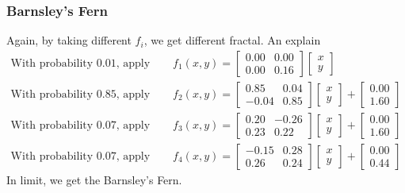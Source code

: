 \documentclass[../../Problems]{subfiles}
\begin{document}
\subsubsection{Barnsley's Fern}{\label{pp:barnsleyfern}}
Again, by taking different $f_i$, we get different fractal. An explain
\begin{align}
	\text{With probability 0.01, apply }& \quad f_{1}(x,y) = {\begin{bmatrix}0.00&0.00\\0.00&0.16\end{bmatrix}}{\begin{bmatrix}x\\y\end{bmatrix}}\\
	\text{With probability 0.85, apply }& \quad f_{2}(x,y) = {\begin{bmatrix}0.85&0.04\\-0.04&0.85\end{bmatrix}}{\begin{bmatrix}x\\y\end{bmatrix}}+{\begin{bmatrix}0.00\\1.60\end{bmatrix}}\\
	\text{With probability 0.07, apply }& \quad f_{3}(x,y) = {\begin{bmatrix}0.20&-0.26\\0.23&0.22\end{bmatrix}}{\begin{bmatrix}x\\y\end{bmatrix}}+{\begin{bmatrix}0.00\\1.60\end{bmatrix}}\\
	\text{With probability 0.07, apply }& \quad f_{4}(x,y) = {\begin{bmatrix}-0.15&0.28\\0.26&0.24\end{bmatrix}}{\begin{bmatrix}x\\y\end{bmatrix}}+{\begin{bmatrix}0.00\\0.44\end{bmatrix}}
\end{align}
In limit, we get the Barnsley's Fern.
\end{document}
